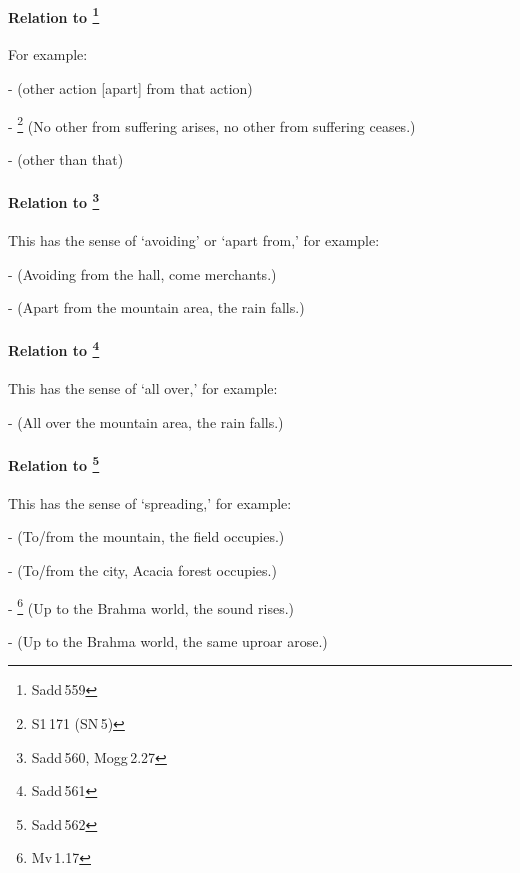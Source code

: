 \paragraph*{Relation to \footnote{Sadd\,559}} For example:\par
-  (other action [apart] from that action)\par
- \footnote{S1\,171 (SN\,5)} (No other from suffering arises, no other from suffering ceases.)\par
-  (other than that)\par

\paragraph*{Relation to \footnote{Sadd\,560, Mogg\,2.27}} This has the sense of `avoiding' or `apart from,' for example:\par
-  (Avoiding from the hall, come merchants.)\par
-  (Apart from the mountain area, the rain falls.)\par

\paragraph*{Relation to \footnote{Sadd\,561}} This has the sense of `all over,' for example:\par
-  (All over the mountain area, the rain falls.)\par

\paragraph*{Relation to \footnote{Sadd\,562}} This has the sense of `spreading,' for example:\par
-  (To/from the mountain, the field occupies.)\par
-  (To/from the city, Acacia forest occupies.)\par
- \footnote{Mv\,1.17} (Up to the Brahma world, the sound rises.)\par
-  (Up to the Brahma world, the same uproar arose.)\par


